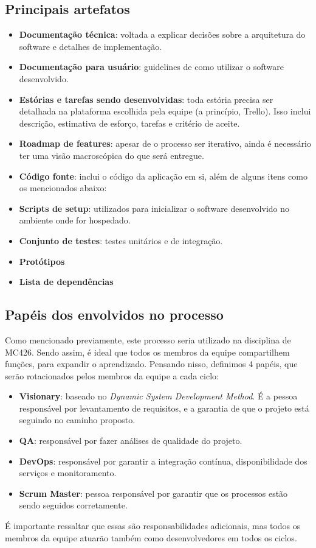 \documentclass[12pt]{article}
\begin{document}
\subsection*{Principais artefatos}
\begin{itemize}
	\item \textbf{Documentação técnica}: voltada a explicar decisões sobre a arquitetura do software e detalhes de implementação.
	\item \textbf{Documentação para usuário}: guidelines de como utilizar o software desenvolvido.
	\item \textbf{Estórias e tarefas sendo desenvolvidas}: toda estória precisa ser detalhada na plataforma escolhida pela equipe (a princípio, Trello). Isso inclui descrição, estimativa de esforço, tarefas e critério de aceite.
	\item \textbf{Roadmap de features}: apesar de o processo ser iterativo, ainda é necessário ter uma visão macroscópica do que será entregue.
	\item \textbf{Código fonte}: inclui o código da aplicação em si, além de alguns itens como os mencionados abaixo:
	\item \textbf{Scripts de setup}: utilizados para inicializar o software desenvolvido no ambiente onde for hospedado.
	\item \textbf{Conjunto de testes}: testes unitários e de integração.
	\item \textbf{Protótipos}
	\item \textbf{Lista de dependências}
\end{itemize}


\subsection*{Papéis dos envolvidos no processo}

Como mencionado previamente, este processo seria utilizado na disciplina de MC426. Sendo assim, é ideal que todos os membros da equipe compartilhem funções, para expandir o aprendizado. Pensando nisso, definimos 4 papéis, que serão rotacionados pelos membros da equipe a cada ciclo:

\begin{itemize}
	\item \textbf{Visionary}: baseado no \textit{Dynamic System Development Method}. É a pessoa responsável por levantamento de requisitos, e a garantia de que o projeto está seguindo no caminho proposto.
	\item \textbf{QA}: responsável por fazer análises de qualidade do projeto.
	\item \textbf{DevOps}: responsável por garantir a integração contínua, disponibilidade dos serviços e monitoramento.
	\item \textbf{Scrum Master}: pessoa responsável por garantir que os processos estão sendo seguidos corretamente.
\end{itemize}

É importante ressaltar que essas são responsabilidades adicionais, mas todos os membros da equipe atuarão também como desenvolvedores em todos os ciclos.
\end{document}
